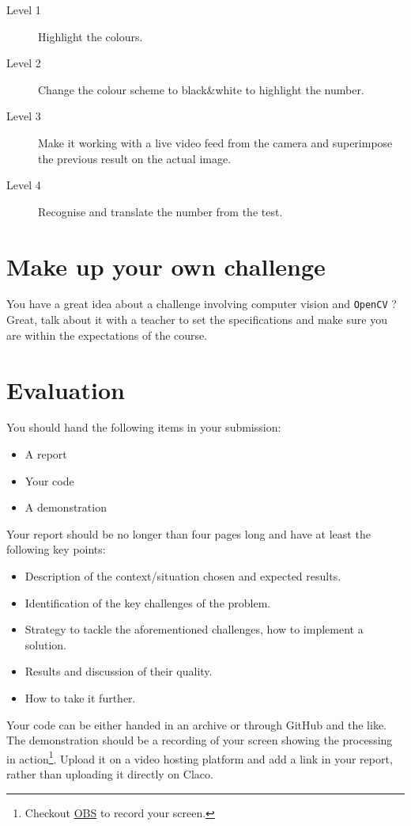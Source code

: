 \documentclass{labo}
\newcommand{\opencv}{\texttt{OpenCV} }
\begin{document}
\begin{description}
	\item[Level 1] Highlight the colours.
	\item[Level 2] Change the colour scheme to black\&white to highlight the number.
	\item[Level 3] Make it working with a live video feed from the camera and superimpose the previous result on the actual image.
	\item[Level 4] Recognise and translate the number from the test.
\end{description}


\section*{Make up your own challenge}
You have a great idea about a challenge involving computer vision and \opencv? Great, talk about it with a teacher to set the specifications and make sure you are within the expectations of the course.


\section*{Evaluation}
You should hand the following items in your submission:
\begin{itemize}
	\item A report
	\item Your code
	\item A demonstration
\end{itemize}

Your report should be no longer than four pages long and have at least the following key points:
\begin{itemize}
	\item Description of the context/situation chosen and expected results.
	\item Identification of the key challenges of the problem.
	\item Strategy to tackle the aforementioned challenges, how to implement a solution.
	\item Results and discussion of their quality.
	\item How to take it further.
\end{itemize}

Your code can be either handed in an archive or through GitHub and the like.
The demonstration should be a recording of your screen showing the processing in action\footnote{Checkout \href{https://obsproject.com/}{OBS} to record your screen.}. Upload it on a video hosting platform and add a link in your report, rather than uploading it directly on Claco.
\end{document}
